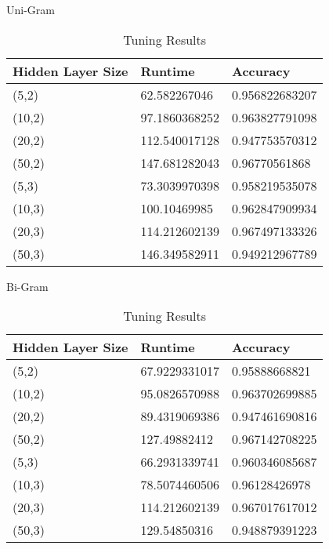 \begin{table}[H]
\centering
\begin{subtable}{.5\textwidth}
\caption{Uni-Gram}
\label{Unit-Gram-Tune-MLP}
\begin{tabular}{@{}lll@{}}
\toprule
Hidden Layer Size & Runtime & Accuracy \\ \midrule
(5,2) & 62.582267046 & 0.956822683207 \\
(10,2) & 97.1860368252 & 0.963827791098 \\
(20,2) & 112.540017128 & 0.947753570312 \\
(50,2) & 147.681282043 & 0.96770561868 \\
(5,3) & 73.3039970398 & 0.958219535078 \\
(10,3) & 100.10469985  &  0.962847909934 \\
(20,3) & 114.212602139 & 0.967497133326 \\ 
(50,3) & 146.349582911 & 0.949212967789 \\ \bottomrule
\end{tabular}

\caption{Bi-Gram}
\label{Bi-Gram-Tune-MLP}
\begin{tabular}{@{}lll@{}}
\toprule
Hidden Layer Size & Runtime & Accuracy \\ \midrule
(5,2) & 67.9229331017 & 0.95888668821 \\
(10,2) & 95.0826570988 & 0.963702699885 \\
(20,2) & 89.4319069386 & 0.947461690816 \\
(50,2) & 127.49882412 & 0.967142708225 \\
(5,3) & 66.2931339741 & 0.960346085687 \\
(10,3) & 78.5074460506  &  0.96128426978 \\
(20,3) & 114.212602139 &  0.967017617012 \\ 
(50,3) & 129.54850316 & 0.948879391223 \\ \bottomrule
\end{tabular}
\end{subtable}
\caption{Tuning Results}
\end{table}


